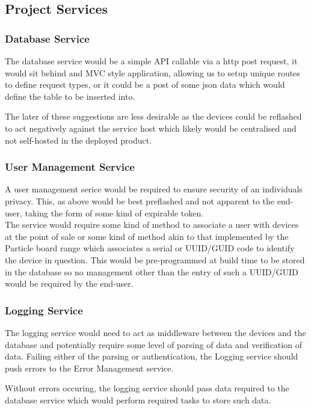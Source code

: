 \documentclass{article}
\begin{document}
        \subsection{Project Services}
            \subsubsection{Database Service}
            The database service would be a simple API callable via a http post request, it would sit behind 
            and MVC style application, allowing us to setup unique routes to define request types, or it could
            be a post of some json data which would define the table to be inserted into.
            \par
            The later of these suggestions are less desirable as the devices could be reflashed to act 
            negatively against the service host which likely would be centralised and not self-hosted in the
            deployed product.

            \subsubsection{User Management Service}
            A user management serice would be required to ensure security of an individuals privacy.
            This, as above would be best preflashed and not apparent to the end-user, taking the form of
            some kind of expirable token.
            \\
            The service would require some kind of method to associate a user with devices at the point of sale
            or some kind of method akin to that implemented by the Particle board range \cite{Particle}
            which associates a serial or UUID/GUID code to identify the device in question.
            This would be pre-programmed at build time to be stored in the database so no management 
            other than the entry of such a UUID/GUID would be required by the end-user.

            \subsubsection{Logging Service}
            The logging service would need to act as middleware between the devices and the database and 
            potentially require some level of parsing of data and verification of data. Failing either of the
            parsing or authentication, the Logging service should push errors to the Error Management service.
            \par
            Without errors occuring, the logging service should pass data required to the database service which
            would perform required tasks to store such data.
\end{document}
